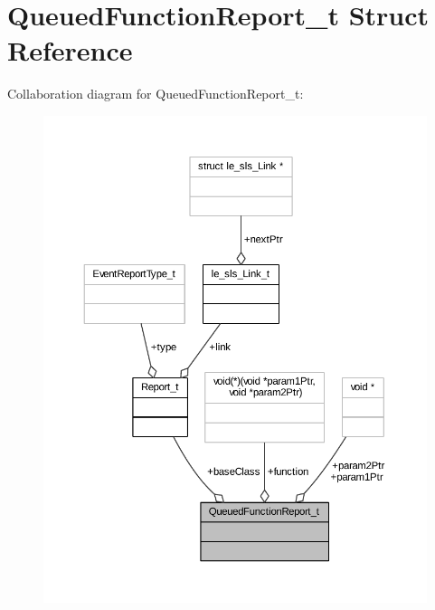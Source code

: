 \hypertarget{struct_queued_function_report__t}{}\section{Queued\+Function\+Report\+\_\+t Struct Reference}
\label{struct_queued_function_report__t}


Collaboration diagram for Queued\+Function\+Report\+\_\+t\+:
\nopagebreak
\begin{figure}[H]
\begin{center}
\leavevmode
\includegraphics[width=350pt]{struct_queued_function_report__t__coll__graph}
\end{center}
\end{figure}
